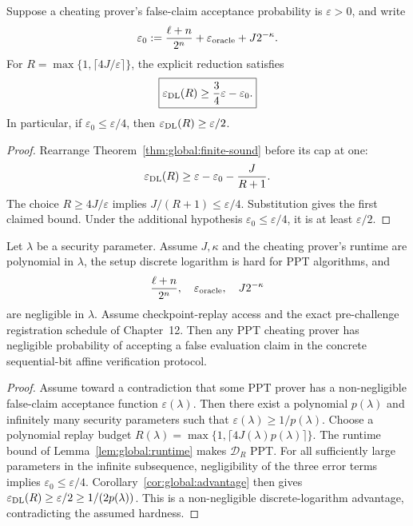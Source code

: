 \begin{corollary}\label{cor:global:advantage}
Suppose a cheating prover's false-claim
acceptance probability is
$\varepsilon>0$, and write
\[
 \varepsilon_0:=
 \frac{\ell+n}{2^n}
 +\varepsilon_{\rm oracle}
 +J2^{-\kappa}.
\]
For
$R=\max\{1,\lceil4J/\varepsilon\rceil\}$,
the explicit reduction satisfies
\[
 \boxed{
 \varepsilon_{\rm DL}(R)
 \ge \frac34\varepsilon-\varepsilon_0.
 }
\]
In particular, if
$\varepsilon_0\le\varepsilon/4$,
then $\varepsilon_{\rm DL}(R)
\ge\varepsilon/2$.
\end{corollary}
\begin{proof}
Rearrange
Theorem~\ref{thm:global:finite-sound}
before its cap at one:
\[
 \varepsilon_{\rm DL}(R)
 \ge\varepsilon-\varepsilon_0-\frac{J}{R+1}.
\]
The choice $R\ge4J/\varepsilon$
implies $J/(R+1)\le\varepsilon/4$.
Substitution gives the first
claimed bound. Under the additional
hypothesis
$\varepsilon_0\le\varepsilon/4$,
it is at least $\varepsilon/2$.
\end{proof}

\begin{theorem}\label{thm:global:asymptotic}
Let $\lambda$ be a security parameter.
Assume $J,\kappa$ and the cheating prover's
runtime are polynomial in $\lambda$,
the setup discrete logarithm is hard
for PPT algorithms, and
\[
 \frac{\ell+n}{2^n},\quad
 \varepsilon_{\rm oracle},\quad
 J2^{-\kappa}
\]
are negligible in $\lambda$.
Assume checkpoint-replay access and
the exact pre-challenge registration
schedule of Chapter~12.
Then any PPT cheating prover has
negligible probability of accepting
a false evaluation claim in the
concrete sequential-bit affine
verification protocol.
\end{theorem}
\begin{proof}
Assume toward a contradiction
that some PPT prover has a
non-negligible false-claim
acceptance function $\varepsilon(\lambda)$.
Then there exist a polynomial
$p(\lambda)$ and infinitely
many security parameters such that
$\varepsilon(\lambda)\ge1/p(\lambda)$.
Choose a polynomial replay budget
$R(\lambda)=\max\{1,\lceil
4J(\lambda)p(\lambda)\rceil\}$.
The runtime bound of
Lemma~\ref{lem:global:runtime}
makes $\mathcal D_R$ PPT.
For all sufficiently large
parameters in the infinite
subsequence, negligibility of
the three error terms implies
$\varepsilon_0\le\varepsilon/4$.
Corollary~\ref{cor:global:advantage}
then gives
$\varepsilon_{\rm DL}(R)
\ge\varepsilon/2
\ge1/(2p(\lambda))$.
This is a non-negligible
discrete-logarithm advantage,
contradicting the assumed
hardness.
\end{proof}

